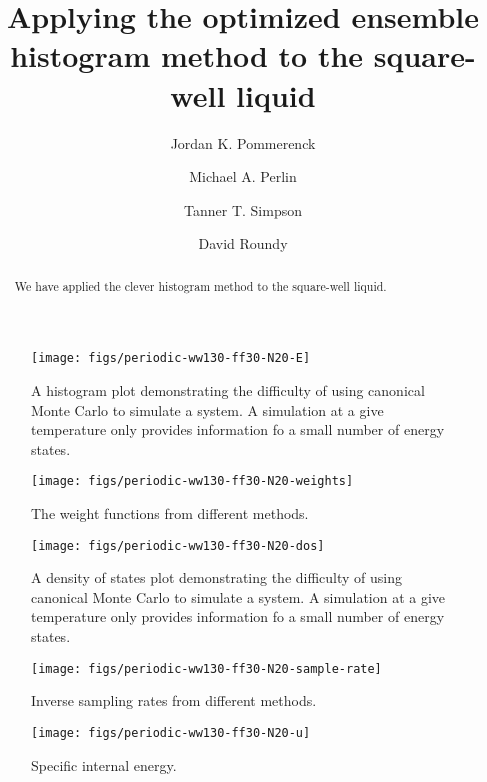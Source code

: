 \documentclass[letterpaper,twocolumn,amsmath,amssymb,pre,aps,10pt]{revtex4-1}
\begin{document}
\title{Applying the optimized ensemble histogram method to the
  square-well liquid}

\author{Jordan K. Pommerenck} \author{Michael A. Perlin}
\author{Tanner T. Simpson} \author{David Roundy}

\begin{abstract}
  We have applied the clever histogram method to the square-well
  liquid.
\end{abstract}

\maketitle

\begin{figure}
  \texttt{[image: figs/periodic-ww130-ff30-N20-E]}
  \caption{A histogram plot demonstrating the difficulty of using
    canonical Monte Carlo to simulate a system.  A simulation at a
    give temperature only provides information fo a small number of
    energy states.\label{fig:histograms}}
\end{figure}

\begin{figure}
  \texttt{[image: figs/periodic-ww130-ff30-N20-weights]}
  \caption{The weight functions from different methods.}
\end{figure}

\begin{figure}
  \texttt{[image: figs/periodic-ww130-ff30-N20-dos]}
  \caption{A density of states plot demonstrating the difficulty of
    using canonical Monte Carlo to simulate a system.  A simulation at
    a give temperature only provides information fo a small number of
    energy states.\label{fig:dos}}
\end{figure}

\begin{figure}
  \texttt{[image: figs/periodic-ww130-ff30-N20-sample-rate]}
  \caption{Inverse sampling rates from different methods.}
\end{figure}


\begin{figure}
  \texttt{[image: figs/periodic-ww130-ff30-N20-u]}
  \caption{Specific internal energy.\label{fig:u}}
\end{figure}
\end{document}
